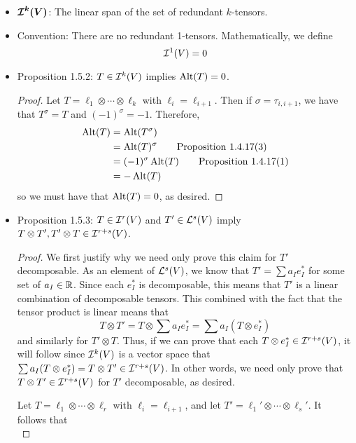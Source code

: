 \documentclass[../notes.tex]{subfiles}
\begin{document}
\begin{itemize}
    \item $\bm{\ide[k]{V}}$: The linear span of the set of redundant $k$-tensors.
    \item Convention: There are no redundant 1-tensors. Mathematically, we define
    \begin{equation*}
        \ide[1]{V} = 0
    \end{equation*}
    \item Proposition 1.5.2: $T\in\ide[k]{V}$ implies $\Alt(T)=0$.
    \begin{proof}
        Let $T=\ell_1\otimes\cdots\otimes\ell_k$ with $\ell_i=\ell_{i+1}$. Then if $\sigma=\tau_{i,i+1}$, we have that $T^\sigma=T$ and $(-1)^\sigma=-1$. Therefore,
        \begin{align*}
            \Alt(T) &= \Alt(T^\sigma)\\
            &= \Alt(T)^\sigma\tag*{Proposition 1.4.17(3)}\\
            &= (-1)^\sigma\Alt(T)\tag*{Proposition 1.4.17(1)}\\
            &= -\Alt(T)
        \end{align*}
        so we must have that $\Alt(T)=0$, as desired.
    \end{proof}
    \item Proposition 1.5.3: $T\in\ide[r]{V}$ and $T'\in\lin[s]{V}$ imply $T\otimes T',T'\otimes T\in\ide[r+s]{V}$.
    \begin{proof}
        We first justify why we need only prove this claim for $T'$ decomposable. As an element of $\lin[s]{V}$, we know that $T'=\sum a_Ie_I^*$ for some set of $a_I\in\R$. Since each $e_I^*$ is decomposable, this means that $T'$ is a linear combination of decomposable tensors. This combined with the fact that the tensor product is linear means that
        \begin{equation*}
            T\otimes T' = T\otimes\sum a_Ie_I^*
            = \sum a_I(T\otimes e_I^*)
        \end{equation*}
        and similarly for $T'\otimes T$. Thus, if we can prove that each $T\otimes e_I^*\in\ide[r+s]{V}$, it will follow since $\ide[k]{V}$ is a vector space that $\sum a_I(T\otimes e_I^*)=T\otimes T'\in\ide[r+s]{V}$. In other words, we need only prove that $T\otimes T'\in\ide[r+s]{V}$ for $T'$ decomposable, as desired.\par
        Let $T=\ell_1\otimes\cdots\otimes\ell_r$ with $\ell_i=\ell_{i+1}$, and let $T'=\ell_1'\otimes\cdots\otimes\ell_s'$. It follows that
        \begin{equation*}

\end{equation*}
\end{proof}
\end{itemize}
\end{document}

